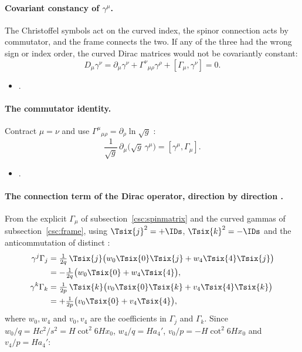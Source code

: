 \paragraph{Covariant constancy of $\gamma^\mu$.} The Christoffel symbols act on the curved index,
the spinor connection acts by commutator, and the frame connects the two. If any of the three had
the wrong sign or index order, the curved Dirac matrices would not be covariantly constant:
\begin{equation}
  D_\mu\gamma^\nu=\partial_\mu\gamma^\nu+\Gamma^\nu{}_{\mu\rho}\gamma^\rho+[\Gamma_\mu,\gamma^\nu]=0 .
\end{equation}
\begin{itemize}
  \item {} .
\end{itemize}

\paragraph{The commutator identity.} Contract $\mu=\nu$ and use
$\Gamma^\mu{}_{\mu\rho}=\partial_\rho\ln\sqrt g$ \cfderived:
\begin{equation}\label{csc:eq:commutator}
  \frac{1}{\sqrt g}\,\partial_\mu\bigl(\sqrt g\,\gamma^\mu\bigr)=[\gamma^\mu,\Gamma_\mu] .
\end{equation}
\begin{itemize}
  \item {} .
\end{itemize}

\paragraph{The connection term of the Dirac operator, direction by direction \cfderived.} From the
explicit $\Gamma_\mu$ of subsection~\ref{csc:spinmatrix} and the curved gammas of
subsection~\ref{csc:frame}, using $\Tsix{j}^2=+\IDs$, $\Tsix{k}^2=-\IDs$ and the anticommutation of
distinct :
\begin{align}
  \gamma^j\Gamma_j&=\tfrac{1}{2q}\,\Tsix{j}\bigl(w_0\Tsix{0}\Tsix{j}+w_4\Tsix{4}\Tsix{j}\bigr)\notag\\
    &=-\tfrac{1}{2q}\bigl(w_0\Tsix{0}+w_4\Tsix{4}\bigr),\\
  \gamma^k\Gamma_k&=\tfrac{1}{2p}\,\Tsix{k}\bigl(v_0\Tsix{0}\Tsix{k}+v_4\Tsix{4}\Tsix{k}\bigr)\notag\\
    &=+\tfrac{1}{2p}\bigl(v_0\Tsix{0}+v_4\Tsix{4}\bigr),
\end{align}
where $w_0,w_4$ and $v_0,v_4$ are the coefficients in $\Gamma_j$ and $\Gamma_k$. Since
$w_0/q=Hc^2/s^2=H\cot^2 6Hx_0$, $w_4/q=Ha_4'$, $v_0/p=-H\cot^2 6Hx_0$ and $v_4/p=Ha_4'$:

